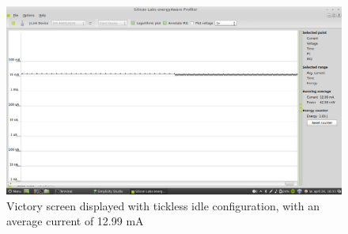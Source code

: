 \begin{figure}[H]
  \centering
  \includegraphics[clip, trim=0cm 0cm 0cm 0cm, width=12cm]{fig/Victory.png}
  \caption{Victory screen displayed with tickless idle configuration, with an average current of 12.99 mA}
\end{figure}
